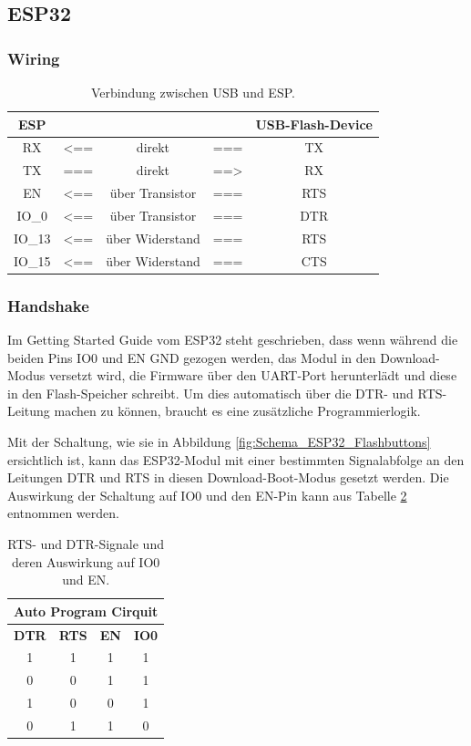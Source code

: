 \subsection{ESP32}\label{Appendix:Handshake_ESP}

\subsubsection{Wiring}\label{Appendix:Handshake_ESP_wiring}
\begin{table}[H]
\center
\begin{tabular}{|c|lcl|c|}
\hline
\textbf{ESP} & & & & \textbf{USB-Flash-Device} \\ \hline
RX & <== & direkt & === & TX  \\
TX & === & direkt & ==> & RX  \\
EN & <== & über Transistor & === & RTS \\
IO\_0 & <== & über Transistor & === & DTR \\
IO\_13 & <== & über Widerstand & === & RTS \\
IO\_15 & <== & über Widerstand & === & CTS \\
\hline
\end{tabular}
\caption{Verbindung zwischen USB und ESP.}
\label{tab:USB_ESP}
\end{table}

\subsubsection{Handshake}\label{Appendix:Handshake_ESP_Messung}

Im Getting Started Guide vom ESP32 steht geschrieben, dass wenn während die beiden Pins IO0 und EN GND gezogen werden, das Modul in den Download-Modus versetzt wird, die Firmware über den UART-Port herunterlädt und diese in den Flash-Speicher schreibt. Um dies automatisch über die DTR- und RTS-Leitung machen zu können, braucht es eine zusätzliche Programmierlogik.

Mit der Schaltung, wie sie in Abbildung \ref{fig:Schema_ESP32_Flashbuttons} ersichtlich ist, kann das ESP32-Modul mit einer bestimmten Signalabfolge an den Leitungen DTR und RTS in diesen Download-Boot-Modus gesetzt werden. Die Auswirkung der Schaltung auf IO0 und den EN-Pin kann aus Tabelle \ref{tab:Einfluss_Boot_Schaltung} entnommen werden.

\begin{table}[H]
\center
\begin{tabular}{|c|c||c|c|}
\hline
\multicolumn{4}{|c|}{\textbf{Auto Program Cirquit}}\\
\hline
\textbf{DTR} & \textbf{RTS} & \textbf{EN} & \textbf{IO0} \\
\hline
1 & 1 & 1 & 1 \\
\hline
0 & 0 & 1 & 1 \\
\hline
1 & 0 & 0 & 1 \\
\hline
0 & 1 & 1 & 0 \\
\hline
\end{tabular}

\caption{RTS- und DTR-Signale und deren Auswirkung auf IO0 und EN.}
\label{tab:Einfluss_Boot_Schaltung}
\end{table}

